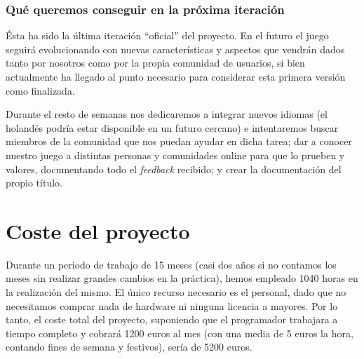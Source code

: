 \subsubsection{Qué queremos conseguir en la próxima iteración}
Ésta ha sido la última iteración ``oficial'' del proyecto. En el futuro el juego seguirá evolucionando con nuevas características y aspectos que vendrán dados tanto por nosotros como por la propia comunidad de usuarios, si bien actualmente ha llegado al punto necesario para considerar esta primera versión como finalizada.

Durante el resto de semanas nos dedicaremos a integrar nuevos idiomas (el holandés podría estar disponible en un futuro cercano) e intentaremos buscar miembros de la comunidad que nos puedan ayudar en dicha tarea; dar a conocer nuestro juego a distintas personas y comunidades online para que lo prueben y valores, documentando todo el \textit{feedback} recibido; y crear la documentación del propio título.

\section{Coste del proyecto}

Durante un periodo de trabajo de 15 meses (casi dos años si no contamos los meses sin realizar grandes cambios en la práctica), hemos empleado 1040 horas en la realización del mismo.
El único recurso necesario es el personal, dado que no necesitamos comprar nada de hardware ni ninguna licencia a mayores. Por lo tanto, el coste total del proyecto, suponiendo que el programador trabajara a tiempo completo y cobrará 1200 euros al mes (con una media de 5 euros la hora, contando fines de semana y festivos), sería de 5200 euros.